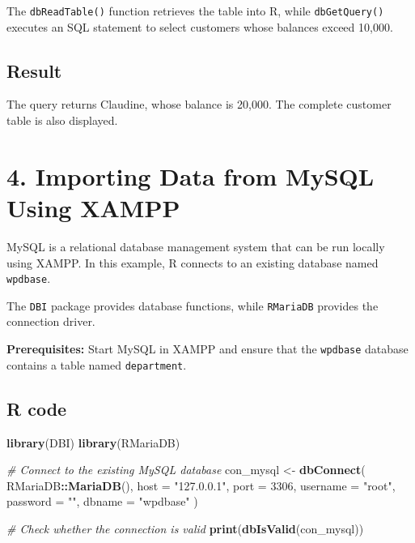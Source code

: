 \documentclass[
]{article}
\newenvironment{Shaded}{\begin{snugshade}}{\end{snugshade}}
\newcommand{\AttributeTok}[1]{\textcolor[rgb]{0.13,0.29,0.53}{#1}}
\newcommand{\CommentTok}[1]{\textcolor[rgb]{0.56,0.35,0.01}{\textit{#1}}}
\newcommand{\DecValTok}[1]{\textcolor[rgb]{0.00,0.00,0.81}{#1}}
\newcommand{\FunctionTok}[1]{\textcolor[rgb]{0.13,0.29,0.53}{\textbf{#1}}}
\newcommand{\NormalTok}[1]{#1}
\newcommand{\OtherTok}[1]{\textcolor[rgb]{0.56,0.35,0.01}{#1}}
\newcommand{\SpecialCharTok}[1]{\textcolor[rgb]{0.81,0.36,0.00}{\textbf{#1}}}
\newcommand{\StringTok}[1]{\textcolor[rgb]{0.31,0.60,0.02}{#1}}
\begin{document}
The \texttt{dbReadTable()} function retrieves the table into R, while
\texttt{dbGetQuery()} executes an SQL statement to select customers
whose balances exceed 10,000.

\subsection{Result}\label{result-2}

The query returns Claudine, whose balance is 20,000. The complete
customer table is also displayed.

\section{4. Importing Data from MySQL Using
XAMPP}\label{importing-data-from-mysql-using-xampp}

MySQL is a relational database management system that can be run locally
using XAMPP. In this example, R connects to an existing database named
\texttt{wpdbase}.

The \texttt{DBI} package provides database functions, while
\texttt{RMariaDB} provides the connection driver.

\textbf{Prerequisites:} Start MySQL in XAMPP and ensure that the
\texttt{wpdbase} database contains a table named \texttt{department}.

\subsection{R code}\label{r-code-3}

\begin{Shaded}
\begin{Highlighting}[]
\FunctionTok{library}\NormalTok{(DBI)}
\FunctionTok{library}\NormalTok{(RMariaDB)}

\CommentTok{\# Connect to the existing MySQL database}
\NormalTok{con\_mysql }\OtherTok{\textless{}{-}} \FunctionTok{dbConnect}\NormalTok{(}
\NormalTok{  RMariaDB}\SpecialCharTok{::}\FunctionTok{MariaDB}\NormalTok{(),}
  \AttributeTok{host =} \StringTok{"127.0.0.1"}\NormalTok{,}
  \AttributeTok{port =} \DecValTok{3306}\NormalTok{,}
  \AttributeTok{username =} \StringTok{"root"}\NormalTok{,}
  \AttributeTok{password =} \StringTok{""}\NormalTok{,}
  \AttributeTok{dbname =} \StringTok{"wpdbase"}
\NormalTok{)}

\CommentTok{\# Check whether the connection is valid}
\FunctionTok{print}\NormalTok{(}\FunctionTok{dbIsValid}\NormalTok{(con\_mysql))}
\end{Highlighting}
\end{Shaded}
\end{document}
